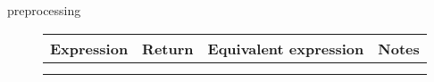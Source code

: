 \begin{description}
    \item[preprocessing]
    \begin{table}[ht]
    \begin{tabular}{@{}llll@{}}
    \toprule
    \textbf{Expression} & \textbf{Return} & \textbf{Equivalent expression} & \textbf{Notes} \\ \midrule
       &                 &                                &                \\
                    &                 &                                &                \\ \bottomrule
    \end{tabular}
    \end{table}
\end{description}
